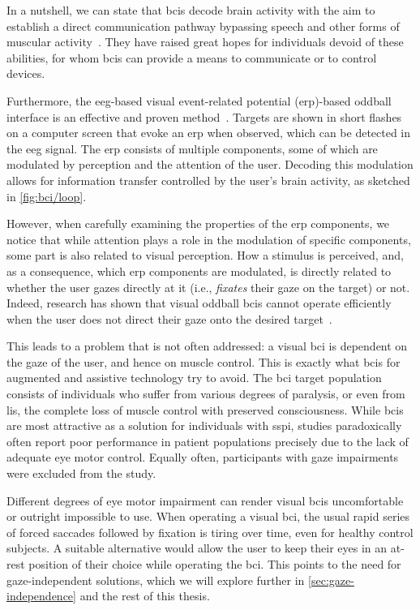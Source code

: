 In a nutshell, we can state that \acp{bci} decode brain activity with the aim to
establish a direct communication pathway bypassing speech and other forms of muscular
activity~\cite{Naci2012,Chaudhary2016}.
They have raised great hopes for individuals devoid of these abilities, for whom
\acp{bci} can provide a means to communicate or to control devices.

Furthermore, the \ac{eeg}-based visual event-related potential (\ac{erp})-based oddball
interface is an effective and proven method~\cite{Wolpaw2018,Severens2020}.
Targets are shown in short flashes on a computer screen that evoke an \ac{erp} when
observed, which can be detected in the \ac{eeg} signal.
The \ac{erp} consists of multiple components, some of which are modulated by perception
and the attention of the user.
Decoding this modulation allows for information transfer controlled by the user's brain
activity, as sketched in \autoref{fig:bci/loop}.

However, when carefully examining the properties of the \ac{erp} components, we notice
that while attention plays a role in the modulation of specific components, some part is
also related to visual perception.
How a stimulus is perceived, and, as a consequence, which \ac{erp} components are
modulated, is directly related to whether the user gazes directly at it (i.e.,
\emph{fixates} their gaze on the target) or not.
Indeed, research has shown that visual oddball \ac{bci}s cannot operate efficiently when
the user does not direct their gaze onto the desired target~\cite{Brunner2010, Frenzel2011}.

This leads to a problem that is not often addressed:
a visual \ac{bci} is dependent on the gaze of the user, and hence on muscle control.
This is exactly what \acp{bci} for augmented and assistive technology try to avoid.
The \ac{bci} target population consists of individuals who suffer from various degrees
of paralysis, or even from \ac{lis}, the complete loss of muscle control with preserved
consciousness.
While \ac{bci}s are most attractive as a solution for individuals with \ac{sspi},
studies paradoxically often report poor performance in patient populations precisely due
to the lack of adequate eye motor control.
Equally often, participants with gaze impairments were excluded from the study.

Different degrees of eye motor impairment can render visual \ac{bci}s uncomfortable or
outright impossible to use.
When operating a visual \ac{bci}, the usual rapid series of forced saccades followed by
fixation is tiring over time, even for healthy control subjects.
A suitable alternative would allow the user to keep their eyes in an at-rest position of
their choice while operating the \ac{bci}.
This points to the need for gaze-independent solutions, which we will explore further in
\autoref{sec:gaze-independence} and the rest of this thesis.
